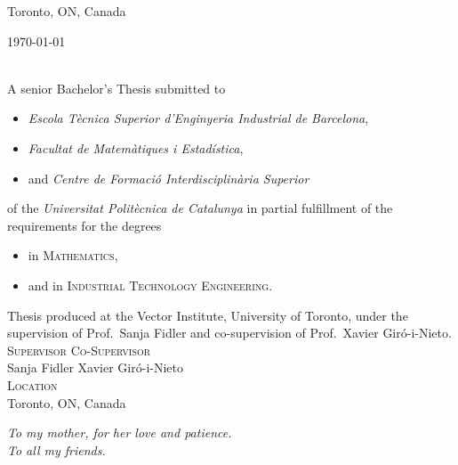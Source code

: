 \begin{titlepage}
  \vfill

  Toronto, ON, Canada \hfill \@date

  \makeatother
\end{titlepage}


\thispagestyle{plain}
\null
\vfill
\makeatletter
\begin{sloppypar}
  \noindent \@author{} \textcopyright{} \today \\
  \texttt{\@title} \\
\end{sloppypar}
\makeatother

\noindent A senior Bachelor's Thesis submitted to
\begin{itemize}
  \item \textsl{Escola Tècnica Superior d'Enginyeria Industrial de Barcelona},
  \item \textsl{Facultat de Matemàtiques i Estadística},
  \item and \textsl{Centre de Formació Interdisciplinària Superior}
\end{itemize}
of the \textit{Universitat Politècnica de Catalunya} in partial fulfillment of
the requirements for the degrees
\begin{itemize}
  \item in \textsc{Mathematics},
  \item and in \textsc{Industrial Technology Engineering}. \\
\end{itemize}

\noindent Thesis produced at the Vector Institute, University of Toronto, under
the supervision of Prof.\ Sanja Fidler and co-supervision of Prof.\ Xavier
Giró-i-Nieto. \\

\noindent \textsc{Supervisor} \hfill \textsc{Co-Supervisor} \\
Sanja Fidler \hfill Xavier Giró-i-Nieto \\

\noindent \textsc{Location} \\
Toronto, ON, Canada \\



\cleardoublepage
\thispagestyle{empty}
\begin{flushright}
  \itshape
  To my mother, for her love and patience. \\
  To all my friends.
\end{flushright}


